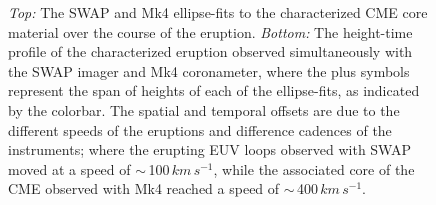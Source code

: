 \documentclass[namedreferences]{solarphysics}
\begin{document}
\begin{article}
\begin{figure}[t]
\caption{\emph{Top:} The SWAP and Mk4 ellipse-fits to the characterized CME core material over the course of the eruption. \emph{Bottom:} The height-time profile of the characterized eruption observed simultaneously with the SWAP imager and Mk4 coronameter, where the plus symbols represent the span of heights of each of the ellipse-fits, as indicated by the colorbar. The spatial and temporal offsets are due to the different speeds of the eruptions and difference cadences of the instruments; where the erupting EUV loops observed with SWAP moved at a speed of $\sim$\,100$\,km\,s^{-1}$, while the associated core of the CME observed with Mk4 reached a speed of $\sim$\,400$\,km\,s^{-1}$.}
\label{ell_heights_inner}
\end{figure}


\end{article}
\end{document}
